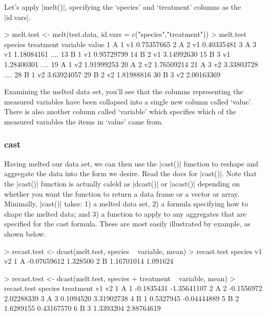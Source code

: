 Let's apply |melt()|, specifying the `species' and `treatment' columns as the |id.vars|.
%
\begin{R}
> melt.test <- melt(test.data, id.vars = c("species","treatment"))
> melt.test
   species treatment variable       value
1        A         1       v1  0.75357665
2        A         2       v1  0.40335481
3        A         3       v1  1.18084161
....
13       B         1       v1  0.95729799
14       B         2       v1  3.14992630
15       B         3       v1  1.28400301
....
19       A         1       v2  1.91999253
20       A         2       v2  1.76509214
21       A         3       v2  3.33803728
....
28       B         1       v2  3.63924057
29       B         2       v2  1.81988816
30       B         3       v2  2.00163369
\end{R}
%
Examining the melted data set, you'll see that the columns representing the measured variables have been collapsed into a single new column called `value'.  There is also another column called `variable' which specifies which of the measured variables the items in `value' came from.

\subsubsection{cast}

Having melted our data set, we can then use the |cast()| function to reshape and aggregate the data into the form we desire.  Read the docs for |cast()|.  Note that the |cast()| function is actually caleld as |dcast()| or |acast()| depending on whether you want the function to return a data frame or a vector or array. Minimally, |cast()| takes: 1) a melted data set,  2) a formula specifying how to shape the melted data; and 3) a function to apply to any aggregates that are specified for the cast formula. These are most easily illustrated by example, as shown below.
%
\begin{R}
> recast.test <- dcast(melt.test, species ~ variable, mean)
> recast.test
  species          v1       v2
1       A -0.07659612 1.328500
2       B  1.16701014 1.091624

> recast.test <- dcast(melt.test, species + treatment ~ variable, mean) 
> recast.test
  species treatment         v1          v2
1       A         1 -0.1835431 -1.35641107
2       A         2 -0.1556972  2.02288339
3       A         3  0.1094520  3.31902738
4       B         1  0.5327945 -0.04444889
5       B         2  1.6289155  0.43167570
6       B         3  1.3393204  2.88764619   
\end{R}
